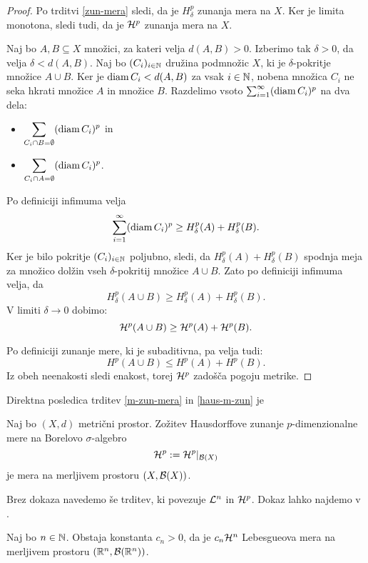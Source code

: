 \begin{proof}
    Po trditvi \ref{zun-mera} sledi, da je \(H^p_\delta\) zunanja mera na \(X\). Ker je limita monotona, sledi tudi, da je \(\mathcal{H}^p\) zunanja mera na \(X\).

    Naj bo \(A, B \subseteq X\) množici, za kateri velja \(d(A, B) > 0\). Izberimo tak \(\delta > 0\), da velja \(\delta < d(A, B)\). Naj bo \((C_i)_{i \in \mathbb{N}}\) družina podmnožic \(X\), ki je \(\delta\)-pokritje množice \(A \cup B\).
    Ker je \(\operatorname{diam} C_i < d(A, B)\) za vsak \(i \in \mathbb{N}\), nobena množica \(C_i\) ne seka hkrati množice \(A\) in množice \(B\). Razdelimo vsoto \(\sum_{i=1}^{\infty} (\operatorname{diam} C_i)^p\) na dva dela:
    \begin{itemize}
        \item \(\displaystyle \sum_{C_i \cap B = \emptyset} (\operatorname{diam} C_i)^p\) in
        \item \(\displaystyle \sum_{C_i \cap A = \emptyset} (\operatorname{diam} C_i)^p\).
    \end{itemize}
    Po definiciji infimuma velja 
    \[\sum_{i=1}^{\infty} (\operatorname{diam} C_i)^p \geq H^p_\delta(A) + H^p_\delta(B).\]
    Ker je bilo pokritje \((C_i)_{i \in \mathbb{N}}\) poljubno, sledi, da \(H^p_\delta(A) + H^p_\delta(B)\) spodnja meja za množico dolžin vseh \(\delta\)-pokritij množice \(A \cup B\). Zato po definiciji infimuma velja, da
    \[H_\delta^p(A \cup B) \geq H^p_\delta(A) + H^p_\delta(B).\]
    V limiti \(\delta \to 0\) dobimo:
    \[\mathcal{H}^p(A \cup B) \geq \mathcal{H}^p(A) + \mathcal{H}^p(B).\]

    Po definiciji zunanje mere, ki je subaditivna, pa velja tudi:
    \[H^p(A \cup B) \leq H^p(A) + H^p(B).\]
    Iz obeh neenakosti sledi enakost, torej \(\mathcal{H}^p\) zadošča pogoju metrike.
\end{proof}

Direktna posledica trditev \ref{m-zun-mera} in \ref{haus-m-zun} je
\begin{posledica}
    Naj bo \((X, d)\) metrični prostor. Zožitev Hausdorffove zunanje \(p\)-dimenzionalne mere na Borelovo \(\sigma\)-algebro 
    \[\mathcal{H}^p := \mathcal{H}^p|_{\mathcal{B}(X)}\]
    je mera na merljivem prostoru \((X,\mathcal{B}(X))\).
\end{posledica}

Brez dokaza navedemo še trditev, ki povezuje \(\mathcal{L}^n\) in \(\mathcal{H}^p\). Dokaz lahko najdemo v \cite[stran 351]{f-ra}.
\begin{trditev}
    \label{haus-leb}
    Naj bo \(n \in \mathbb{N}\). Obstaja konstanta \(c_n > 0\), da je \(c_n \mathcal{H}^n\) Lebesgueova mera na merljivem prostoru \((\mathbb{R}^n, \mathcal{B}(\mathbb{R}^n))\).
\end{trditev}

